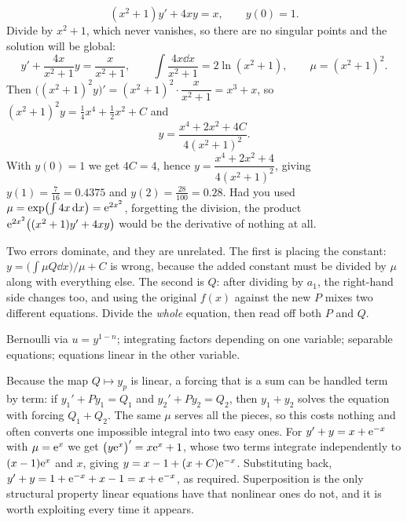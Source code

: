 \begin{worked}
\[(x^{2}+1)y'+4xy=x,\qquad y(0)=1.\]
Divide by $x^{2}+1$, which never vanishes, so there are no singular points and the solution will be global:
\[y'+\frac{4x}{x^{2}+1}y=\frac{x}{x^{2}+1},\qquad \int\frac{4x\dd x}{x^{2}+1}=2\ln(x^{2}+1),\qquad \mu=(x^{2}+1)^{2}.\]
Then $\bigl((x^{2}+1)^{2}y\bigr)'=(x^{2}+1)^{2}\cdot\dfrac{x}{x^{2}+1}=x^{3}+x$, so $(x^{2}+1)^{2}y=\tfrac14x^{4}+\tfrac12x^{2}+C$ and
\[y=\frac{x^{4}+2x^{2}+4C}{4(x^{2}+1)^{2}}.\]
With $y(0)=1$ we get $4C=4$, hence $y=\dfrac{x^{4}+2x^{2}+4}{4(x^{2}+1)^{2}}$, giving $y(1)=\tfrac{7}{16}=0.4375$ and $y(2)=\tfrac{28}{100}=0.28$. Had you used $\mu=\exp\bigl(\int4x\,\mathrm{d} x\bigr)=\mathrm{e}^{2x^{2}}$, forgetting the division, the product $\mathrm{e}^{2x^{2}}\bigl((x^{2}+1)y'+4xy\bigr)$ would be the derivative of nothing at all.
\end{worked}

\begin{trap}
Two errors dominate, and they are unrelated. The first is placing the constant: $y=\bigl(\int\mu Q\dd x\bigr)/\mu+C$ is wrong, because the added constant must be divided by $\mu$ along with everything else. The second is $Q$: after dividing by $a_1$, the right-hand side changes too, and using the original $f(x)$ against the new $P$ mixes two different equations. Divide the \emph{whole} equation, then read off both $P$ and $Q$.
\end{trap}

\begin{seealsob}Bernoulli via $u=y^{1-n}$; integrating factors depending on one variable; separable equations; equations linear in the other variable.\end{seealsob}

\begin{keynote}
Because the map $Q\mapsto y_p$ is linear, a forcing that is a sum can be handled term by term: if $y_1'+Py_1=Q_1$ and $y_2'+Py_2=Q_2$, then $y_1+y_2$ solves the equation with forcing $Q_1+Q_2$. The same $\mu$ serves all the pieces, so this costs nothing and often converts one impossible integral into two easy ones. For $y'+y=x+\mathrm{e}^{-x}$ with $\mu=\mathrm{e}^{x}$ we get $\bigl(y\mathrm{e}^{x}\bigr)'=x\mathrm{e}^{x}+1$, whose two terms integrate independently to $(x-1)\mathrm{e}^{x}$ and $x$, giving $y=x-1+(x+C)\mathrm{e}^{-x}$. Substituting back, $y'+y=1+\mathrm{e}^{-x}+x-1=x+\mathrm{e}^{-x}$, as required. Superposition is the only structural property linear equations have that nonlinear ones do not, and it is worth exploiting every time it appears.
\end{keynote}

